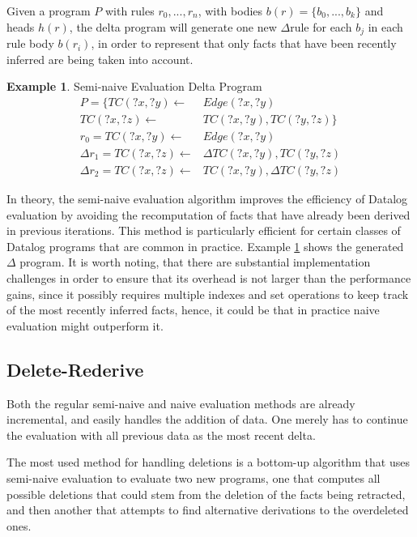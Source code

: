 \documentclass[sigconf,screen,review,natbib]{acmart}
\theoremstyle{definition}
\newtheorem{exmp}{Example}[section]
\begin{document}
Given a program $P$ with rules $r_0, ..., r_n$, with bodies $b(r) = \{b_0, ..., b_k\}$ and heads $h(r)$, the
delta program will generate one new $\Delta$rule for each $b_j$ in each rule body $b(r_i)$, in order to
represent that only facts that have been recently inferred are being taken into account.
\begin{exmp}{Semi-naive Evaluation Delta Program}
	\begin{align*}
		P = \{TC(?x, ?y) \leftarrow        & Edge(?x, ?y)                  \\
		TC(?x, ?z) \leftarrow              & TC(?x, ?y), TC(?y, ?z) \}     \\
		r_0 = TC(?x, ?y) \leftarrow        & Edge(?x, ?y)                  \\
		\Delta r_1 = TC(?x, ?z) \leftarrow & \Delta TC(?x, ?y), TC(?y, ?z) \\
		\Delta r_2 = TC(?x, ?z) \leftarrow & TC(?x, ?y), \Delta TC(?y, ?z)
	\end{align*}
	\label{exsne}
\end{exmp}
In theory, the semi-naive evaluation algorithm improves the efficiency of Datalog evaluation by avoiding
the recomputation of facts that have already been derived in previous iterations. This method is particularly
efficient for certain classes of Datalog programs that are common in practice. Example \ref{exsne} shows
the generated $\Delta$ program. It is worth noting, that there are substantial implementation challenges in order
to ensure that its overhead is not larger than the performance gains, since it possibly requires multiple
indexes and set operations to keep track of the most recently inferred facts, hence, it could be that in practice
naive evaluation might outperform it.

\subsection{Delete-Rederive}
Both the regular semi-naive and naive evaluation methods are already incremental, and easily handles the
addition of data. One merely has to continue the evaluation with all previous data as the most recent delta.

The most used method for handling deletions is a bottom-up algorithm\cite{dred} that uses semi-naive evaluation
to evaluate two new programs, one that computes all possible deletions that could stem from the deletion of the
facts being retracted, and then another that attempts to find alternative derivations to the overdeleted ones.
\end{document}
